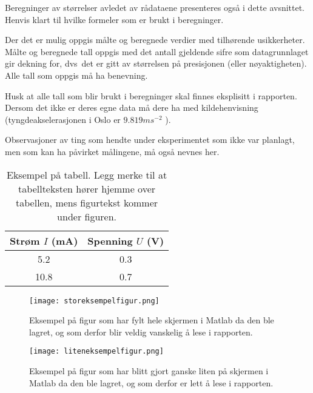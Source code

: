 \documentclass[norsk,a4paper,12pt]{article}
\begin{document}
Beregninger av størrelser avledet av rådataene presenteres også i dette avsnittet. Henvis klart til hvilke formeler som er brukt i beregninger. 

Der det er mulig oppgis målte og beregnede verdier med tilhørende usikkerheter. Målte og beregnede tall oppgis med det antall gjeldende sifre som datagrunnlaget gir dekning for, dvs\ det er gitt av størrelsen på presisjonen (eller nøyaktigheten). Alle tall som oppgis må ha benevning.

Husk at alle tall som blir brukt i beregninger skal finnes eksplisitt i rapporten. Dersom det ikke er deres egne data må dere ha med kildehenvisning (tyngdeakselerasjonen i Oslo er $9.819 ms^{-2}$ \cite{g_Wik}).

Observasjoner av ting som hendte under eksperimentet som ikke
  var planlagt, men som kan ha påvirket målingene, må også nevnes her.

\begin{table}
  \begin{center}
  \caption{Eksempel på tabell. Legg merke til at tabellteksten hører hjemme over tabellen, mens figurtekst kommer under figuren.}
  \begin{tabular}{|c|c|} \hline
  \textbf{Strøm $I$ (mA)} & \textbf{Spenning $U$ (V)} \\ \hline
  5.2 & 0.3 \\
  10.8 & 0.7 \\ \hline
  \end{tabular}
  \end{center}
  \label{tab:eksempel}
\end{table}

\begin{figure}
\begin{center}
  \texttt{[image: storeksempelfigur.png]}\\
  \caption{Eksempel på figur som har fylt hele skjermen i Matlab da den ble lagret, og som derfor blir veldig vanskelig å lese i rapporten. }\label{fig:Matlabstor}
  \end{center}
\end{figure}

\begin{figure}
\begin{center}
  \texttt{[image: liteneksempelfigur.png]}\\
  \caption{Eksempel på figur som har blitt gjort ganske liten på skjermen i Matlab da den ble lagret, og som derfor er lett å lese i rapporten. }\label{fig:Matlabliten}
  \end{center}
\end{figure}
\end{document}
